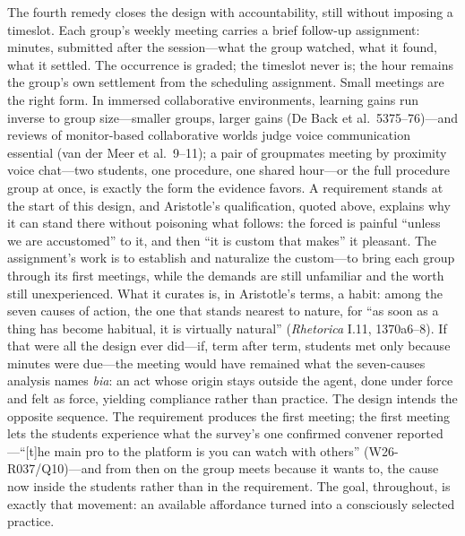 The fourth remedy closes the design with accountability, still without
imposing a timeslot. Each group's weekly meeting carries a brief
follow-up assignment: minutes, submitted after the session---what the
group watched, what it found, what it settled. The occurrence is
graded; the timeslot never is; the hour remains the group's own
settlement from the scheduling assignment. Small meetings are the
right form. In immersed collaborative environments, learning gains run
inverse to group size---smaller groups, larger gains (De Back et al.\
5375--76)---and reviews of monitor-based collaborative worlds judge
voice communication essential (van der Meer et al.\ 9--11); a pair of
groupmates meeting by proximity voice chat---two students, one procedure,
one shared hour---or the full procedure group at once, is exactly the
form the evidence favors. A requirement stands at the start of this
design, and Aristotle's qualification, quoted above, explains why it
can stand there without poisoning what follows: the forced is painful
``unless we are accustomed'' to it, and then ``it is custom that
makes'' it pleasant. The assignment's work is to establish and naturalize the custom---to
bring each group through its first meetings, while the demands are
still unfamiliar and the worth still unexperienced. What it curates
is, in Aristotle's terms, a habit: among the seven causes of action,
the one that stands nearest to nature, for ``as soon as a thing has
become habitual, it is virtually natural'' (\textit{Rhetorica} I.11,
1370a6--8). If that were all
the design ever did---if, term after term, students met only because
minutes were due---the meeting would have remained what the
seven-causes analysis names \textit{bia}: an act whose origin stays
outside the agent, done under force and felt as force, yielding
compliance rather than practice. The design intends the opposite
sequence. The requirement produces the first meeting; the first
meeting lets the students experience what the survey's one confirmed
convener reported---``[t]he main pro to the platform is you can watch
with others'' (W26-R037/Q10)---and from then on the group meets
because it wants to, the cause now inside the students rather than in
the requirement. The goal, throughout, is exactly that movement: an
available affordance turned into a consciously selected practice.

